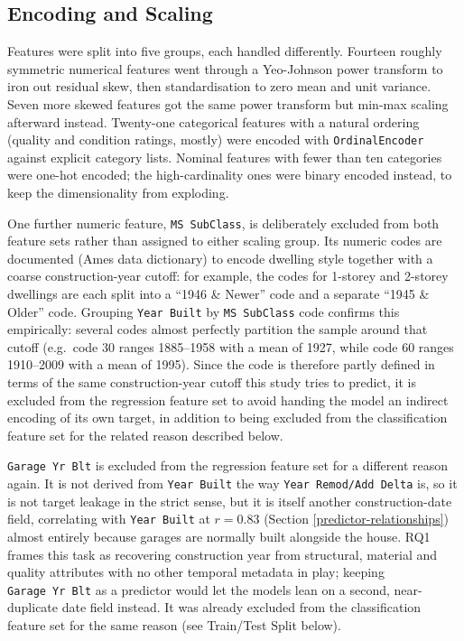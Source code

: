 \documentclass[11pt,a4paper]{article}
\begin{document}
\subsection{Encoding and Scaling}\label{encoding-and-scaling}

Features were split into five groups, each handled differently. Fourteen
roughly symmetric numerical features went through a Yeo-Johnson power
transform \autocite{YeoJohnson2000} to iron out residual skew, then
standardisation to zero mean and unit variance. Seven more skewed
features got the same power transform but min-max scaling afterward
instead. Twenty-one categorical features with a natural ordering
(quality and condition ratings, mostly) were encoded with
\texttt{OrdinalEncoder} against explicit category lists. Nominal
features with fewer than ten categories were one-hot encoded; the
high-cardinality ones were binary encoded instead, to keep the
dimensionality from exploding.

One further numeric feature, \texttt{MS\ SubClass}, is deliberately
excluded from both feature sets rather than assigned to either scaling
group. Its numeric codes are documented (Ames data dictionary) to encode
dwelling style together with a coarse construction-year cutoff: for
example, the codes for 1-storey and 2-storey dwellings are each split
into a ``1946 \& Newer'' code and a separate ``1945 \& Older'' code.
Grouping \texttt{Year\ Built} by \texttt{MS\ SubClass} code confirms
this empirically: several codes almost perfectly partition the sample
around that cutoff (e.g.~code 30 ranges 1885--1958 with a mean of 1927,
while code 60 ranges 1910--2009 with a mean of 1995). Since the code is
therefore partly defined in terms of the same construction-year cutoff
this study tries to predict, it is excluded from the regression feature
set to avoid handing the model an indirect encoding of its own target,
in addition to being excluded from the classification feature set for
the related reason described below.

\texttt{Garage\ Yr\ Blt} is excluded from the regression feature set for
a different reason again. It is not derived from \texttt{Year\ Built}
the way \texttt{Year\ Remod/Add\ Delta} is, so it is not target leakage
in the strict sense, but it is itself another construction-date field,
correlating with \texttt{Year\ Built} at \(r = 0.83\) (Section
\ref{predictor-relationships}) almost entirely because garages are
normally built alongside the house. RQ1 frames this task as recovering
construction year from structural, material and quality attributes with
no other temporal metadata in play; keeping \texttt{Garage\ Yr\ Blt} as
a predictor would let the models lean on a second, near-duplicate date
field instead. It was already excluded from the classification feature
set for the same reason (see Train/Test Split below).
\end{document}

